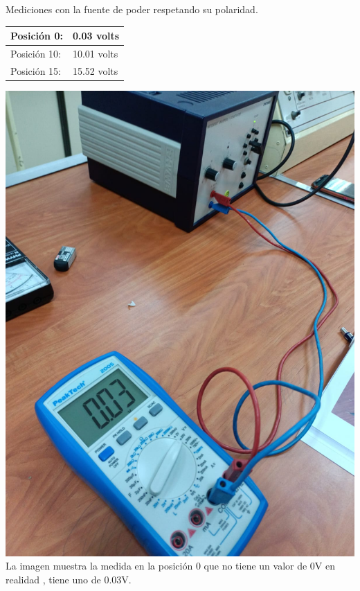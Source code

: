 \documentclass[10pt]{article}
\begin{document}
\begin{multicols}{2}
 Mediciones con la fuente de poder respetando su polaridad.
 
\begin{tabular}{ p{4cm} p{3cm} }
	\hline
	Posición 0: & 0.03 volts \\
	\hline
	Posición 10: & 10.01 volts \\
	\hline
	Posición 15: & 15.52 volts \\
	\hline
\end{tabular}

 \begin{center}
	\includegraphics[scale = 0.1]{Imagenes/Fotos/Cero.jpeg}\\
	La imagen muestra la medida en la posición 0 que no tiene un valor de 0V en realidad , tiene uno de 0.03V.

\end{center}
\end{multicols}
\end{document}

